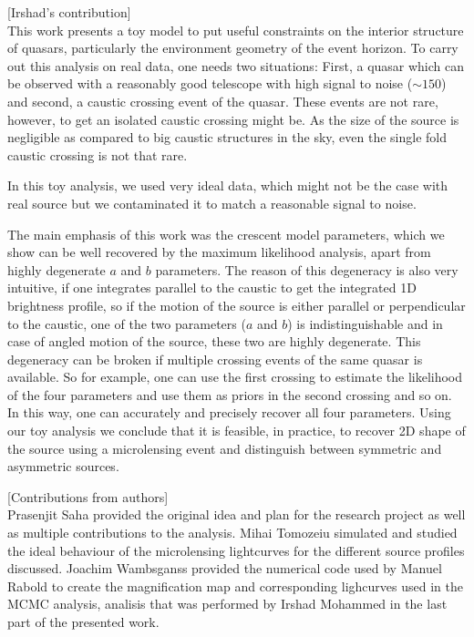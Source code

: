 [Irshad's contribution]\\

This work presents a toy model to put useful constraints on the interior structure of quasars, particularly the environment geometry of the event horizon. To carry out this analysis on real data, one needs two situations: First, a quasar which can be observed with a reasonably good telescope with high signal to noise ($\sim 150$) and second, a caustic crossing event of the quasar. These events are not rare, however, to get an isolated caustic crossing might be. As the size of the source is negligible as compared to big caustic structures in the sky, even the single fold caustic crossing is not that rare.

In this toy analysis, we used very ideal data, which might not be the case with real source but we contaminated it to match a reasonable signal to noise. 

The main emphasis of this work was the crescent model parameters, which we show can be well recovered by the maximum likelihood analysis, apart from highly degenerate $a$ and $b$ parameters. The reason of this degeneracy is also very intuitive, if one integrates parallel to the caustic to get the integrated 1D brightness profile, so if the motion of the source is either parallel or perpendicular to the caustic, one of the two parameters ($a$ and $b$) is indistinguishable and in case of angled motion of the source, these two are highly degenerate. This degeneracy can be broken if multiple crossing events of the same quasar is available. So for example, one can use the first crossing to estimate the likelihood of the four parameters and use them as priors in the second crossing and so on. In this way, one can accurately and precisely recover all four parameters. Using our toy analysis we conclude that it is feasible, in practice, to recover 2D shape of the source using a microlensing event and distinguish between symmetric and asymmetric sources.



[Contributions from authors]\\
Prasenjit Saha provided the original idea and plan for the research project as well as multiple contributions to the analysis. Mihai Tomozeiu simulated and studied the ideal behaviour of the microlensing lightcurves for the different source profiles discussed. Joachim Wambsganss provided the numerical code used by Manuel Rabold to create the magnification map and corresponding lighcurves used in the MCMC analysis, analisis that was performed by Irshad Mohammed in the last part of the presented work. 
